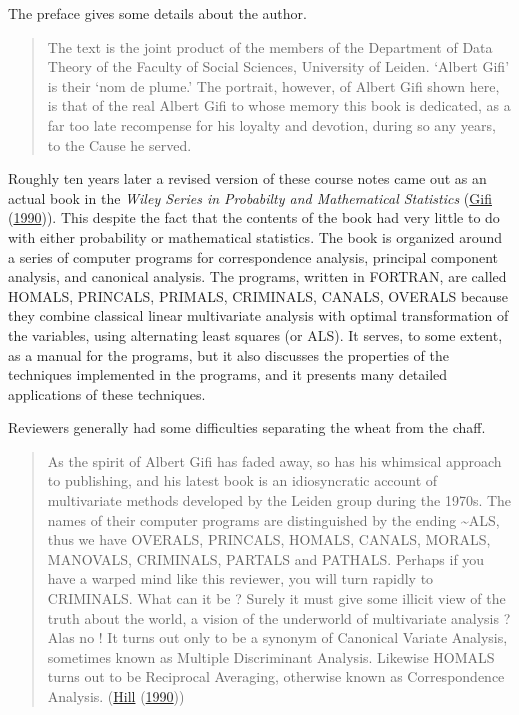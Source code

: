 \documentclass[
  12pt,
]{book}
\begin{document}
The preface gives some details about the author.

\begin{quote}
The text is the joint product of the members of the Department of Data Theory of the Faculty of Social Sciences, University of Leiden.
`Albert Gifi' is their `nom de plume.' The portrait, however, of Albert Gifi shown here, is that of the real Albert Gifi to whose
memory this book is dedicated, as a far too late recompense for his loyalty and devotion, during so any years, to the Cause he served.
\end{quote}

Roughly ten years later a revised version of these course notes came out as an actual book in the \emph{Wiley Series in Probabilty and Mathematical Statistics} (\protect\hyperlink{ref-gifi_B_90}{Gifi} (\protect\hyperlink{ref-gifi_B_90}{1990})). This despite the fact that the contents of the book had very little to do with either probability or mathematical statistics. The book is organized around a series of computer programs for correspondence analysis, principal component analysis, and canonical analysis. The programs, written in FORTRAN, are called HOMALS, PRINCALS, PRIMALS, CRIMINALS, CANALS, OVERALS because they combine classical linear multivariate analysis with optimal transformation of the variables, using alternating least squares (or ALS). It serves, to some extent, as a manual for the programs, but it also discusses the properties of the techniques implemented in the programs, and it presents many detailed applications of these techniques.

Reviewers generally had some difficulties separating the wheat from the chaff.

\begin{quote}
As the spirit of Albert Gifi has faded away, so has his whimsical approach to
publishing, and his latest book is an idiosyncratic account of multivariate methods
developed by the Leiden group during the 1970s. The names of their computer programs
are distinguished by the ending \textasciitilde ALS, thus we have OVERALS, PRINCALS, HOMALS,
CANALS, MORALS, MANOVALS, CRIMINALS, PARTALS and PATHALS. Perhaps if you have a
warped mind like this reviewer, you will turn rapidly to CRIMINALS. What can it be ?
Surely it must give some illicit view of the truth about the world, a vision of the
underworld of multivariate analysis ? Alas no ! It turns out only to be a synonym of
Canonical Variate Analysis, sometimes known as Multiple Discriminant Analysis.
Likewise HOMALS turns out to be Reciprocal Averaging, otherwise known as
Correspondence Analysis. (\protect\hyperlink{ref-hill_90}{Hill} (\protect\hyperlink{ref-hill_90}{1990}))
\end{quote}
\end{document}
